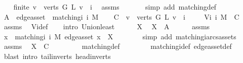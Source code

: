 \begin{isabellebody}
\ \ \isamarkupfalse%
\ {\isachardoublequoteopen}finite\ {\isacharbraceleft}v\ {\isasymin}\ verts\ G{\isachardot}\ L\ v\ {\isacharequal}\ i{\isacharbraceright}{\isachardoublequoteclose}\ \isamarkupfalse%
\ assms\ \isanewline
\ \ \ \ \isamarkupfalse%
\ {\isacharparenleft}simp\ add{\isacharcolon}\ matching{\isacharunderscore}def{\isacharparenright}\isanewline
{}\isamarkupfalse%
\isanewline
\ \ \isamarkupfalse%
\ {\isacharquery}A\ {\isacharequal}\ {\isachardoublequoteopen}edge{\isacharunderscore}as{\isacharunderscore}set\ {\isacharbackquote}\ matching{\isacharunderscore}i\ i\ M{\isachardoublequoteclose}\isanewline
\ \ \isamarkupfalse%
\ {\isacharquery}C\ {\isacharequal}\ {\isachardoublequoteopen}{\isacharbraceleft}v\ {\isasymin}\ verts\ G{\isachardot}\ L\ v\ {\isacharequal}\ i{\isacharbraceright}{\isachardoublequoteclose}\ \isanewline
\ \ \isamarkupfalse%
\ {\isachardoublequoteopen}V{\isacharunderscore}i\ i\ M\ {\isasymsubseteq}\ {\isacharquery}C{\isachardoublequoteclose}\ \isamarkupfalse%
\ assms\ \isamarkupfalse%
\ V{\isacharunderscore}i{\isacharunderscore}def\isanewline
\ \ \isamarkupfalse%
\ {\isacharparenleft}intro\ Union{\isacharunderscore}least{\isacharparenright}\isanewline
\ \ \ \ \isamarkupfalse%
\ X\ \isamarkupfalse%
\ {\isachardoublequoteopen}X\ {\isasymin}\ {\isacharquery}A{\isachardoublequoteclose}\isanewline
\ \ \ \ \isamarkupfalse%
\ assms\ \isamarkupfalse%
\ {\isachardoublequoteopen}{\isasymexists}x\ {\isasymin}\ matching{\isacharunderscore}i\ i\ M{\isachardot}\ edge{\isacharunderscore}as{\isacharunderscore}set\ x\ {\isacharequal}\ X{\isachardoublequoteclose}\isanewline
\ \ \ \ \ \ \isamarkupfalse%
\ {\isacharparenleft}simp\ add{\isacharcolon}\ matching{\isacharunderscore}i{\isacharunderscore}arcs{\isacharunderscore}as{\isacharunderscore}sets{\isacharparenright}\isanewline
\ \ \ \ \isamarkupfalse%
\ assms\ \isamarkupfalse%
\ {\isachardoublequoteopen}X\ {\isasymsubseteq}\ {\isacharquery}C{\isachardoublequoteclose}\ \isanewline
\ \ \ \ \ \ \isamarkupfalse%
\ matching{\isacharunderscore}def\isanewline
\ \ \ \ \ \ \ \ matching{\isacharunderscore}i{\isacharunderscore}def\ edge{\isacharunderscore}as{\isacharunderscore}set{\isacharunderscore}def\ \isamarkupfalse%
\ {\isacharparenleft}blast\ intro{\isacharcolon}\ tail{\isacharunderscore}in{\isacharunderscore}verts\ head{\isacharunderscore}in{\isacharunderscore}verts{\isacharparenright}\isanewline

\end{isabellebody}
